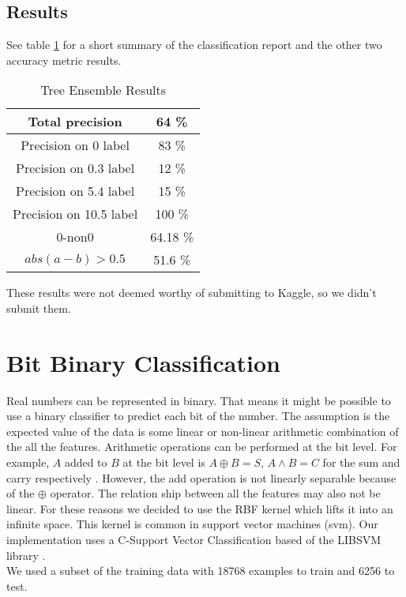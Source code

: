 \documentclass[pdftex,a4paper,11pt]{article}
\begin{document}
\subsection{Results}
See table \ref{table:treeEnsembleReport} for a short summary of the classification report and the other two accuracy metric results. 
  \begin{table}[h]
        {\centering
          \begin{tabular}{|c|c|}
            \hline
             Total precision & 64 \% \\
            \hline
                Precision on 0 label &   83 \% \\
             \hline
                Precision on 0.3 label &   12 \%  \\
                \hline 
                Precision on 5.4 label &   15 \%  \\
                \hline
                Precision on 10.5 label &   100 \%  \\
                  \hline
                  \hline 
                  0-non0 & 64.18 \%\\
                  \hline
                 $abs(a - b) > 0.5$ & 51.6 \% \\
                  \hline
          \end{tabular}
          \caption{Tree Ensemble Results}          
          \label{table:treeEnsembleReport}}
  \end{table}
These results were not deemed worthy of submitting to Kaggle, so we didn't submit them.
  

\section{Bit Binary Classification}
Real numbers can be represented in binary.  That means it might be possible to use a binary classifier to predict each bit of the number.  The assumption is the expected value of the data is some linear or non-linear arithmetic combination of the all the features.  Arithmetic operations can be performed at the bit level.  For example, $A$ added to $B$ at the bit level is $A \oplus B = S$, $A \land B = C$ for the sum and carry respectively \cite{lancaster2001excel}.  However, the add operation is not linearly separable because of the $\oplus$ operator.  The relation ship between all the features may also not be linear.  For these reasons we decided to use the RBF kernel which lifts it into an infinite space. This kernel is common in support vector machines (svm).  Our implementation uses a C-Support Vector Classification based of the LIBSVM library \cite{LIBSVM}\cite{scikit-learn}.\\  We used a subset of the training data with 18768 examples to train and 6256 to test. 
\end{document}
